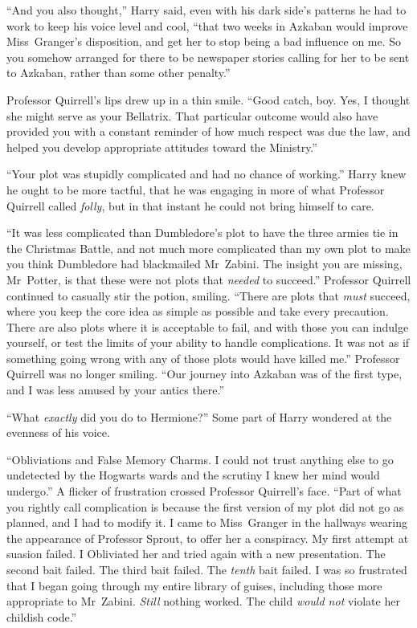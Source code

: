 “And you also thought,” Harry said, even with his dark side’s patterns he had to work to keep his voice level and cool, “that two weeks in Azkaban would improve Miss~Granger’s disposition, and get her to stop being a bad influence on me. So you somehow arranged for there to be newspaper stories calling for her to be sent to Azkaban, rather than some other penalty.”

Professor Quirrell’s lips drew up in a thin smile. “Good catch, boy. Yes, I thought she might serve as your Bellatrix. That particular outcome would also have provided you with a constant reminder of how much respect was due the law, and helped you develop appropriate attitudes toward the Ministry.”

“Your plot was stupidly complicated and had no chance of working.” Harry knew he ought to be more tactful, that he was engaging in more of what Professor Quirrell called \emph{folly}, but in that instant he could not bring himself to care.

“It was less complicated than Dumbledore’s plot to have the three armies tie in the Christmas Battle, and not much more complicated than my own plot to make you think Dumbledore had blackmailed Mr~Zabini. The insight you are missing, Mr~Potter, is that these were not plots that \emph{needed} to succeed.” Professor Quirrell continued to casually stir the potion, smiling. “There are plots that \emph{must} succeed, where you keep the core idea as simple as possible and take every precaution. There are also plots where it is acceptable to fail, and with those you can indulge yourself, or test the limits of your ability to handle complications. It was not as if something going wrong with any of those plots would have killed me.” Professor Quirrell was no longer smiling. “Our journey into Azkaban was of the first type, and I was less amused by your antics there.”

“What \emph{exactly} did you do to Hermione?” Some part of Harry wondered at the evenness of his voice.

“Obliviations and False Memory Charms. I could not trust anything else to go undetected by the Hogwarts wards and the scrutiny I knew her mind would undergo.” A flicker of frustration crossed Professor Quirrell’s face. “Part of what you rightly call complication is because the first version of my plot did not go as planned, and I had to modify it. I came to Miss~Granger in the hallways wearing the appearance of Professor Sprout, to offer her a conspiracy. My first attempt at suasion failed. I Obliviated her and tried again with a new presentation. The second bait failed. The third bait failed. The \emph{tenth} bait failed. I was so frustrated that I began going through my entire library of guises, including those more appropriate to Mr~Zabini. \emph{Still} nothing worked. The child \emph{would not} violate her childish code.”

